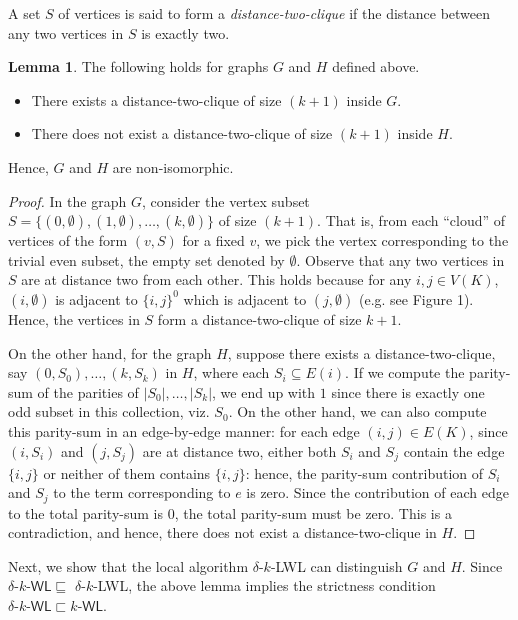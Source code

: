 \documentclass{article}
\theoremstyle{definition}
\newtheorem{lemma}[theorem]{Lemma}
\newcommand{\kwlm}{k\textrm{-}\textsf{WL}\xspace}
\newcommand{\deltakwlm}{\delta\textrm{-}k\textrm{-}\textsf{WL}\xspace}
\newcommand{\localkwl}{$\delta$-$k$-\textsf{LWL}\xspace}
\begin{document}
A set $S$ of vertices is said to form a \emph{distance-two-clique} if the distance between any two vertices in $S$ is exactly two. 
\begin{lemma}
	The following holds for graphs $G$ and $H$ defined above. 
	\begin{itemize}
		\item There exists a distance-two-clique of size $(k+1)$ inside $G$.
		\item There does not exist a distance-two-clique of size $(k+1)$ inside $H$.
	\end{itemize}
	Hence, $G$ and $H$ are non-isomorphic. 
\end{lemma}
\begin{proof}
	In the graph $G$, consider the vertex subset $S = \{(0,\emptyset), (1,\emptyset), \dots, (k,\emptyset)\}$ of size $(k+1)$. That is, from each ``cloud'' of vertices of the form $(v,S)$ for a fixed $v$, we pick the vertex corresponding to the trivial even subset, the empty set denoted by $\emptyset$. Observe that any two vertices in $S$ are at distance two from each other. This holds because for any $i,j \in V(K)$,
	$(i,\emptyset)$ is adjacent to $\{i,j\}^0$ which is adjacent to $(j,\emptyset)$ (e.g. see Figure 1). Hence, the vertices in $S$ form a distance-two-clique of size $k+1$. 
	
	On the other hand, for the graph $H$, suppose there exists a distance-two-clique, say $(0,S_0),\dots, (k,S_k)$ in $H$,
	where each $S_i \subseteq E(i)$. If we compute the parity-sum of the parities of $|S_0|,\dots,|S_k|$, we end up with $1$ since there is exactly one odd subset in this collection, viz. $S_0$. On the other hand, we can also compute this parity-sum in an edge-by-edge manner: for each edge $(i,j)\in E(K)$, since $(i,S_i)$ and $(j,S_j)$ are at distance two, either both $S_i$ and $S_j$ contain the edge $\{i,j\}$ or neither of them contains $\{i,j\}$: hence, the parity-sum contribution of $S_i$ and $S_j$ to the term corresponding to $e$ is zero. Since the contribution of each edge to the total parity-sum is $0$, the total parity-sum must be zero. This is a contradiction, and hence, there does not exist a distance-two-clique in $H$. 
\end{proof}  

Next, we show that the local algorithm \localkwl can distinguish $G$ and $H$. Since $\deltakwlm \sqsubseteq$ \localkwl, the above lemma implies the strictness condition $\deltakwlm \sqsubset \kwlm$. 
\end{document}
